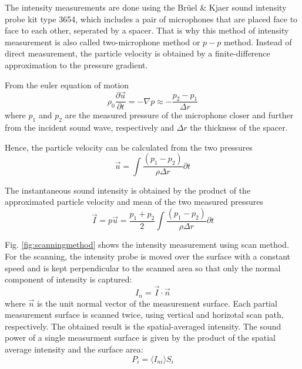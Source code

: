 The intensity measurements are done using the Brüel \& Kjaer sound intensity probe kit type 3654, which includes a pair of microphones that are placed face
to face to each other, seperated by a spacer. That is why this method of intensity measurement is also called two-microphone method or $p-p$ method. Instead of
direct measurement, the particle velocity is obtained by a finite-difference approximation to the pressure gradient. \cite{jocobsen_2005}\cite{moschioni_2008}

From the euler equation of motion
\begin{equation}
    \rho_0 \frac{\partial \Vec{u}}{\partial t} = -\nabla p \approx -\frac{p_2 - p_1}{\Delta r}
\end{equation}
where $p_1$ and $p_2$ are the measured pressure of the microphone closer and further from the incident sound wave, respectively and $\Delta r$ the thickness of the spacer.

Hence, the particle velocity can be calculated from the two pressures
\begin{equation}
    \Vec{u} = \int\frac{(p_1 - p_2)}{\rho \Delta r}\partial t
\end{equation}

The instantaneous sound intensity is obtained by the product of the approximated particle velocity and mean of the two measured pressures
\begin{equation}
    \Vec{I} = p\Vec{u} = \frac{p_1 + p_2}{2} \int\frac{(p_1 - p_2)}{\rho \Delta r}\partial t
\end{equation}

Fig. \ref{fig:scanningmethod} shows the intensity measurement using scan method. For the scanning, the intensity probe is moved over the surface with a constant speed and is kept perpendicular to the scanned area so that only the normal component of intensity is captured:
\begin{equation}
    I_n = \Vec{I} \cdot \Vec{n}
\end{equation}
where $\Vec{n}$ is the unit normal vector of the measurement surface. Each partial measurement surface is scanned twice, using vertical and horizotal scan path, respectively. The obtained result is the spatial-averaged intensity. The sound power of a single measurment surface is given by the product of the spatial average intensity and the surface area:
\begin{equation}
    P_i = \langle I_{ni}\rangle S_i
\end{equation}


